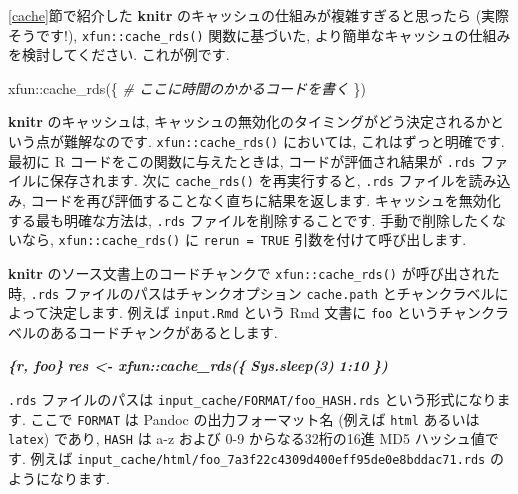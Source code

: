 \documentclass[
  11pt,
  lualatex,
  ja=standard]{bxjsreport}
\newenvironment{Shaded}{\begin{snugshade}}{\end{snugshade}}
\newcommand{\CommentTok}[1]{\textcolor[rgb]{0.56,0.35,0.01}{\textit{#1}}}
\newcommand{\FunctionTok}[1]{\textcolor[rgb]{0.00,0.00,0.00}{#1}}
\newcommand{\InformationTok}[1]{\textcolor[rgb]{0.56,0.35,0.01}{\textbf{\textit{#1}}}}
\newcommand{\NormalTok}[1]{#1}
\newcommand{\SpecialCharTok}[1]{\textcolor[rgb]{0.00,0.00,0.00}{#1}}
\begin{document}
\ref{cache}節で紹介した \textbf{knitr} のキャッシュの仕組みが複雑すぎると思ったら (実際そうです!), \texttt{xfun::cache\_rds()} 関数に基づいた, より簡単なキャッシュの仕組みを検討してください. これが例です.

\begin{Shaded}
\begin{Highlighting}[numbers=left,,]
\NormalTok{xfun}\SpecialCharTok{::}\FunctionTok{cache\_rds}\NormalTok{(\{}
  \CommentTok{\# ここに時間のかかるコードを書く}
\NormalTok{\})}
\end{Highlighting}
\end{Shaded}

\textbf{knitr} のキャッシュは, キャッシュの無効化のタイミングがどう決定されるかという点が難解なのです. \texttt{xfun::cache\_rds()} においては, これはずっと明確です. 最初に R コードをこの関数に与えたときは, コードが評価され結果が \texttt{.rds} ファイルに保存されます. 次に \texttt{cache\_rds()} を再実行すると, \texttt{.rds} ファイルを読み込み, コードを再び評価することなく直ちに結果を返します. キャッシュを無効化する最も明確な方法は, \texttt{.rds} ファイルを削除することです. 手動で削除したくないなら, \texttt{xfun::cache\_rds()} に \texttt{rerun = TRUE} 引数を付けて呼び出します.

\textbf{knitr} のソース文書上のコードチャンクで \texttt{xfun::cache\_rds()} が呼び出された時, \texttt{.rds} ファイルのパスはチャンクオプション \texttt{cache.path} とチャンクラベルによって決定します. 例えば \texttt{input.Rmd} という Rmd 文書に \texttt{foo} というチャンクラベルのあるコードチャンクがあるとします.

\begin{Shaded}
\begin{Highlighting}[]
\InformationTok{\textasciigrave{}\textasciigrave{}\textasciigrave{}\{r, foo\}}
\InformationTok{res \textless{}{-} xfun::cache\_rds(\{}
\InformationTok{  Sys.sleep(3)}
\InformationTok{  1:10}
\InformationTok{\})}
\InformationTok{\textasciigrave{}\textasciigrave{}\textasciigrave{}}
\end{Highlighting}
\end{Shaded}

\texttt{.rds} ファイルのパスは \texttt{input\_cache/FORMAT/foo\_HASH.rds} という形式になります. ここで \texttt{FORMAT} は Pandoc の出力フォーマット名 (例えば \texttt{html} あるいは \texttt{latex}) であり, \texttt{HASH} は a-z および 0-9 からなる32桁の16進 MD5 ハッシュ値です. 例えば \texttt{input\_cache/html/foo\_7a3f22c4309d400eff95de0e8bddac71.rds} のようになります.
\end{document}
